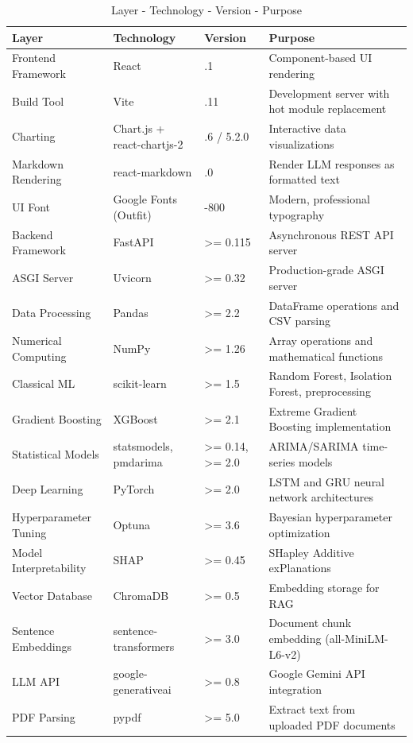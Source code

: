 \documentclass[12pt, a4paper]{report}
\begin{document}
\begin{table}[H]
\centering
\caption{Layer - Technology - Version - Purpose}
\vspace{0.1in}
\begin{tabularx}{\textwidth}{|>{\raggedright\arraybackslash}X|>{\raggedright\arraybackslash}X|>{\raggedright\arraybackslash}X|>{\raggedright\arraybackslash}X|}
\hline
Layer & Technology & Version & Purpose \\ \hline
\hline
Frontend Framework & React & 18.3.1 & Component-based UI rendering \\ \hline
Build Tool & Vite & 5.4.11 & Development server with hot module replacement \\ \hline
Charting & Chart.js + react-chartjs-2 & 4.4.6 / 5.2.0 & Interactive data visualizations \\ \hline
Markdown Rendering & react-markdown & 10.1.0 & Render LLM responses as formatted text \\ \hline
UI Font & Google Fonts (Outfit) & 300-800 & Modern, professional typography \\ \hline
Backend Framework & FastAPI & >= 0.115 & Asynchronous REST API server \\ \hline
ASGI Server & Uvicorn & >= 0.32 & Production-grade ASGI server \\ \hline
Data Processing & Pandas & >= 2.2 & DataFrame operations and CSV parsing \\ \hline
Numerical Computing & NumPy & >= 1.26 & Array operations and mathematical functions \\ \hline
Classical ML & scikit-learn & >= 1.5 & Random Forest, Isolation Forest, preprocessing \\ \hline
Gradient Boosting & XGBoost & >= 2.1 & Extreme Gradient Boosting implementation \\ \hline
Statistical Models & statsmodels, pmdarima & >= 0.14, >= 2.0 & ARIMA/SARIMA time-series models \\ \hline
Deep Learning & PyTorch & >= 2.0 & LSTM and GRU neural network architectures \\ \hline
Hyperparameter Tuning & Optuna & >= 3.6 & Bayesian hyperparameter optimization \\ \hline
Model Interpretability & SHAP & >= 0.45 & SHapley Additive exPlanations \\ \hline
Vector Database & ChromaDB & >= 0.5 & Embedding storage for RAG \\ \hline
Sentence Embeddings & sentence-transformers & >= 3.0 & Document chunk embedding (all-MiniLM-L6-v2) \\ \hline
LLM API & google-generativeai & >= 0.8 & Google Gemini API integration \\ \hline
PDF Parsing & pypdf & >= 5.0 & Extract text from uploaded PDF documents \\ \hline
\end{tabularx}
\end{table}
\end{document}
